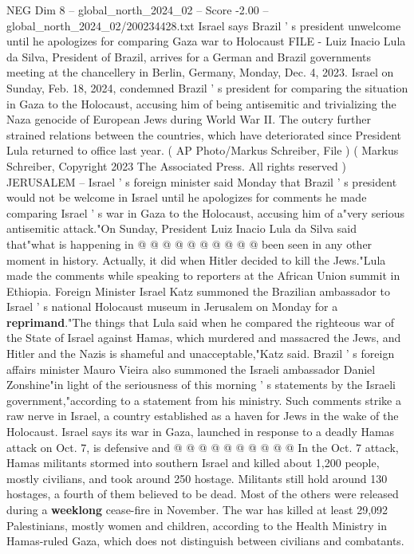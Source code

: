 \begin{textsample}{NEG Dim 8 – global\_north\_2024\_02 – Score -2.00 – global\_north\_2024\_02/200234428.txt}  \label{ex:f8_neg_228}
Israel says Brazil ' s president unwelcome until he apologizes for comparing Gaza war to Holocaust FILE - Luiz Inacio Lula da Silva, President of Brazil, arrives for a German and Brazil governments meeting at the chancellery in Berlin, Germany, Monday, Dec. 4, 2023.
Israel on Sunday, Feb. 18, 2024, condemned Brazil ' s president for comparing the situation in Gaza to the Holocaust, accusing him of being antisemitic and trivializing the Naza genocide of European Jews during World War II.
The outcry further strained relations between the countries, which have deteriorated since President Lula returned to office last year. ( AP Photo/Markus Schreiber, File ) ( Markus Schreiber, Copyright 2023 The Associated Press.
All rights reserved ) JERUSALEM -- Israel ' s foreign minister said Monday that Brazil ' s president would not be welcome in Israel until he apologizes for comments he made comparing Israel ' s war in Gaza to the Holocaust, accusing him of a"very serious antisemitic attack."On Sunday, President Luiz Inacio Lula da Silva said that"what is happening in @ @ @ @ @ @ @ @ @ @ been seen in any other moment in history.
Actually, it did when Hitler decided to kill the Jews."Lula made the comments while speaking to reporters at the African Union summit in Ethiopia.
Foreign Minister Israel Katz summoned the Brazilian ambassador to Israel ' s national Holocaust museum in Jerusalem on Monday for a \textbf{reprimand}."The things that Lula said when he compared the righteous war of the State of Israel against Hamas, which murdered and massacred the Jews, and Hitler and the Nazis is shameful and unacceptable,"Katz said.
Brazil ' s foreign affairs minister Mauro Vieira also summoned the Israeli ambassador Daniel Zonshine"in light of the seriousness of this morning ' s statements by the Israeli government,"according to a statement from his ministry.
Such comments strike a raw nerve in Israel, a country established as a haven for Jews in the wake of the Holocaust.
Israel says its war in Gaza, launched in response to a deadly Hamas attack on Oct. 7, is defensive and @ @ @ @ @ @ @ @ @ @ In the Oct. 7 attack, Hamas militants stormed into southern Israel and killed about 1,200 people, mostly civilians, and took around 250 hostage.
Militants still hold around 130 hostages, a fourth of them believed to be dead.
Most of the others were released during a \textbf{weeklong} cease-fire in November.
The war has killed at least 29,092 Palestinians, mostly women and children, according to the Health Ministry in Hamas-ruled Gaza, which does not distinguish between civilians and combatants.

\end{textsample}
